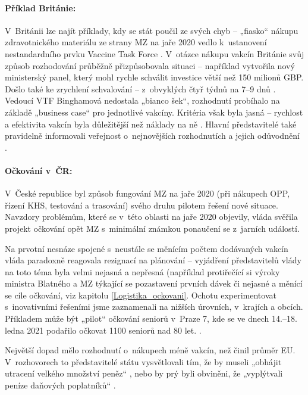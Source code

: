 \paragraph{Příklad Británie:} V~Británii lze najít příklady, kdy se stát poučil ze svých chyb -- „fiasko“ nákupu zdravotnického materiálu ze strany MZ na jaře 2020 vedlo k~ustanovení nestandardního prvku Vaccine Task Force \cite{balls_secrets_2021}. V~otázce nákupu vakcín Británie svůj způsob rozhodování průběžně přizpůsobovala situaci -- například vytvořila nový ministerský panel, který mohl rychle schválit investice větší než 150 milionů GBP. Došlo také ke zrychlení schvalování -- z~obvyklých čtyř týdnů na 7--9 dnů \cite{national_audit_office_investigation_2020}. Vedoucí VTF Binghamová nedostala „bianco šek“, rozhodnutí probíhalo na základě „business case“ pro jednotlivé vakcíny. Kritéria však byla jasná -- rychlost a efektivita vakcín byla důležitější než náklady na ně \cite{bolzen_kate_2021}. Hlavní představitelé také pravidelně informovali veřejnost o~nejnovějších rozhodnutích a jejich odůvodnění \cite{davis_uk_2020}.

\paragraph{Očkování v~ČR:} V~České republice byl způsob fungování MZ na jaře 2020 (při nákupech OPP, řízení KHS, testování a trasování) svého druhu pilotem řešení nové situace. Navzdory problémům, které se v~této oblasti na jaře 2020 objevily, vláda svěřila projekt očkování opět MZ s~minimální známkou ponaučení se z~jarních událostí.

Na prvotní nesnáze spojené s~neustále se měnícím počtem dodávaných vakcín vláda paradoxně reagovala rezignací na plánování -- vyjádření představitelů vlády na toto téma byla velmi nejasná a nepřesná (například protiřečící si výroky ministra Blatného a MZ týkající se pozastavení prvních dávek či nejasné a měnící se cíle očkování, viz kapitolu \ref{Logistika_ockovani}. Ochotu experimentovat s~inovativními řešeními jsme zaznamenali na nižších úrovních, v~krajích a obcích. Příkladem může být „pilot“ očkování seniorů v~Praze 7, kde se ve dnech 14.--18. ledna 2021 podařilo očkovat 1100 seniorů nad 80 let. \cite{bisop_osloveni_2021}.

Největší dopad mělo rozhodnutí o~nákupech méně vakcín, než činil průměr EU. V~rozhovorech to představitelé státu vysvětlovali tím, že by museli „obhájit utracení velkého množství peněz“ \cite{pokorna_proc_2021}, nebo by prý byli obviněni, že „vyplýtvali peníze daňových poplatníků“ \cite{hronova_kdybychom_2021}.

